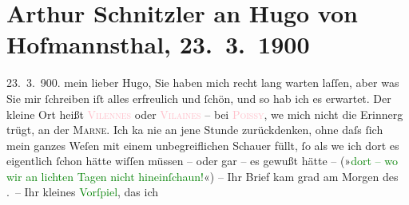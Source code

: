 

               \section[Arthur Schnitzler an Hugo von Hofmannsthal, 23. 3. 1900]{ Arthur Schnitzler an Hugo von Hofmannsthal, 23. 3. 1900}\nopagebreak{}\rehead{ }\normalsize\beginnumbering{} \toendnotes[C]{\smallbreak\pagebreak[2]} 
\toendnotes[C]{\smallbreak}\pstart
           \raggedleft{}{\pb}23. 3. 900.\pend
           \pstart
           mein lieber Hugo, Sie haben mich recht lang warten laſſen, aber was
               Sie mir ſchreiben iſt alles erfreulich und ſchön, und so hab ich es erwartet. Der
               kleine Ort heißt \textcolor{pink}{\textsc{Vilennes}}{}\ledrightnote{\textcolor{pink}{Villenes-sur-Seine}} oder \textcolor{pink}{\textsc{Vilaines}}{}\ledrightnote{\textcolor{pink}{Villenes-sur-Seine}} – bei \textcolor{pink}{\textsc{Poissy}}{}\ledrightnote{\textcolor{pink}{Poissy}}, we{\geminationn} mich nicht die Erinnerg trügt, an der
                  \textsc{Marne}. Ich ka{\geminationn} nie an jene Stunde zurückdenken,
               ohne daſs ſich mein ganzes Weſen mit einem unbegreiflichen Schauer füllt, ſo als we{\geminationn} ich dort es eigentlich ſchon hätte wiſſen müssen – {\pb}oder gar – es gewußt hätte – (»\textcolor{green}{dort – wo wir an lichten Tagen nicht
                  hineinſchaun!}{}«) – Ihr Brief kam grad am Morgen des \label{K_L01024_1v}\label{K_L01024_1h}. –\pend
           \pstart
           Ihr kleines \textcolor{green}{Vorſpiel}{}, das ich
